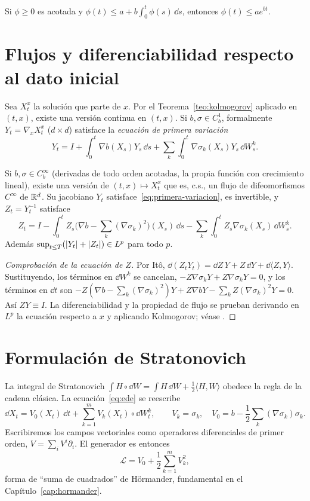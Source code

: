 \begin{lema}[Gronwall]
Si $\phi\ge0$ es acotada y $\phi(t)\le a+b\int_0^t\phi(s)\,\dd s$, entonces $\phi(t)\le ae^{bt}$.
\end{lema}

\section{Flujos y diferenciabilidad respecto al dato inicial}
Sea $X_t^x$ la solución que parte de $x$. Por el Teorema~\ref{teo:kolmogorov} aplicado en $(t,x)$, existe una versión
continua en $(t,x)$. Si $b,\sigma\in C^1_b$, formalmente $Y_t=\nabla_xX_t^x$ ($d\times d$) satisface la \emph{ecuación de primera
variación}
\begin{equation}\label{eq:primera-variacion}
  Y_t=I+\int_0^t\nabla b(X_s)Y_s\,\dd s+\sum_k\int_0^t\nabla\sigma_k(X_s)Y_s\,\dd W^k_s.
\end{equation}

\begin{teorema}[Kunita]\label{teo:kunita}
Si $b,\sigma\in C^\infty_b$ (derivadas de todo orden acotadas, la propia función
con crecimiento lineal), existe una versión de $(t,x)\mapsto X_t^x$ que es, c.s., un flujo de
difeomorfismos $C^\infty$ de $\mathbb{R}^d$. Su jacobiano $Y_t$ satisface~\eqref{eq:primera-variacion}, es invertible, y $Z_t=Y_t^{-1}$ satisface
\[
  Z_t=I-\int_0^tZ_s\Big(\nabla b-\sum_k(\nabla\sigma_k)^2\Big)(X_s)\,\dd s-\sum_k\int_0^tZ_s\nabla\sigma_k(X_s)\,\dd W^k_s.
\]
Además $\sup_{t\le T}(\left\lvert Y_t\right\rvert+\left\lvert Z_t\right\rvert)\in L^p$ para todo $p$.
\end{teorema}

\begin{proof}[Comprobación de la ecuación de $Z$]
Por Itô, $\dd(Z_tY_t)=\dd Z\,Y+Z\,\dd Y+\dd\langle Z,Y\rangle$. Sustituyendo,
los términos en $\dd W^k$ se cancelan, $-Z\nabla\sigma_kY+Z\nabla\sigma_kY=0$, y los términos en $\dd t$ son $-Z(\nabla b-
\sum_k(\nabla\sigma_k)^2)Y+Z\nabla bY-\sum_kZ(\nabla\sigma_k)^2Y=0$. Así $ZY\equiv I$. La diferenciabilidad y la propiedad
de flujo se prueban derivando en $L^p$ la ecuación respecto a $x$ y aplicando Kolmogorov; véase
\cite{Kunita90}.
\end{proof}

\section{Formulación de Stratonovich}
La integral de Stratonovich $\int H\circ\dd W=\int H\,\dd W+\frac12\langle H,W\rangle$ obedece la regla de la cadena
clásica. La ecuación~\eqref{eq:ede} se reescribe
\[
  \dd X_t=V_0(X_t)\,\dd t+\sum_{k=1}^mV_k(X_t)\circ\dd W^k_t,\qquad V_k=\sigma_k,\quad V_0=b-\frac12\sum_k(\nabla\sigma_k)\sigma_k.
\]
Escribiremos los campos vectoriales como operadores diferenciales de primer orden, $V=\sum_iV^i\partial_i$.
El generador es entonces
\[
  \mathcal L=V_0+\frac12\sum_{k=1}^mV_k^2,
\]
forma de ``suma de cuadrados'' de Hörmander, fundamental en el Capítulo~\ref{cap:hormander}.

